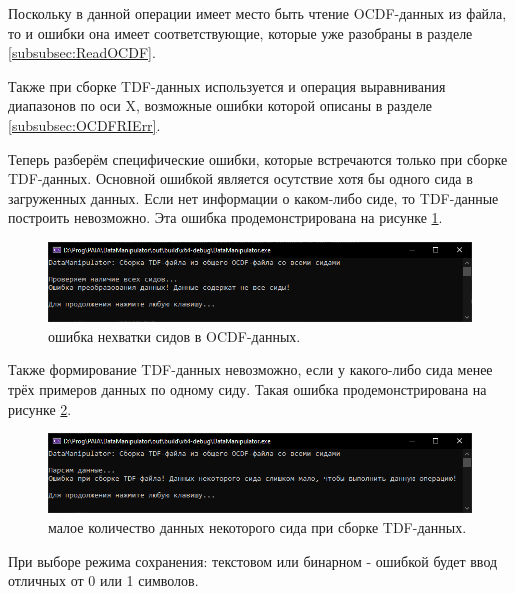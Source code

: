{\standartFont

  \par Поскольку в данной операции имеет место быть чтение OCDF-данных из файла, то и ошибки она имеет соответствующие, которые уже разобраны в разделе \ref{subsubsec:ReadOCDF}.

  \par Также при сборке TDF-данных используется и операция выравнивания диапазонов по оси X, возможные ошибки которой описаны в разделе \ref{subsubsec:OCDFRIErr}.

  \par Теперь разберём специфические ошибки, которые встречаются только при сборке TDF-данных. Основной ошибкой является осутствие хотя бы одного сида в загруженных данных. Если нет информации о каком-либо сиде, то TDF-данные построить невозможно. Эта ошибка продемонстрирована на рисунке \ref{fig:CreateTDFErr1}.

  \begin{figure}[H]
    \centering
    \includegraphics[width=\textwidth]{images/forDataManipulator/CreateTDFErr1.png}
    \caption{ошибка нехватки сидов в OCDF-данных.} 
    \label{fig:CreateTDFErr1}
  \end{figure}

  \par Также формирование TDF-данных невозможно, если у какого-либо сида менее трёх примеров данных по одному сиду. Такая ошибка продемонстрирована на рисунке \ref{fig:CreateTDFErr2}.

  \begin{figure}[H]
    \centering
    \includegraphics[width=\textwidth]{images/forDataManipulator/CreateTDFErr2.png}
    \caption{малое количество данных некоторого сида при сборке TDF-данных.} 
    \label{fig:CreateTDFErr2}
  \end{figure}

  \par При выборе режима сохранения: текстовом или бинарном - ошибкой будет ввод отличных от 0 или 1 символов.

  \par
}
